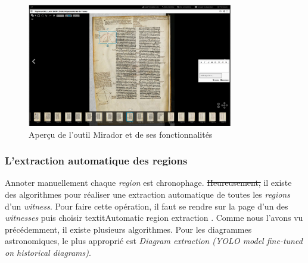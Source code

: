 \begin{figure}[H]
	\centering
	\includegraphics[width=0.8\textwidth]{images/capture_ecran_mirador.png}
	\caption{Aperçu de l'outil Mirador et de ses fonctionnalités}
	\label{fig:apercu_mirador}
\end{figure}


\subsubsection{L'extraction automatique des regions}

Annoter manuellement chaque \textit{region} est chronophage. \st{Heureusement,} il existe des algorithmes pour réaliser une extraction automatique de toutes les \textit{regions} d'un \textit{witness}. 
Pour faire cette opération, il faut se rendre sur la page d'un des \textit{witnesses} puis choisir \og textit{Automatic region extraction} \fg. Comme nous l'avons vu précédemment, il existe plusieurs algorithmes. Pour les diagrammes astronomiques, le plus approprié est \og \textit{Diagram extraction (YOLO model fine-tuned on historical diagrams)}\fg.



